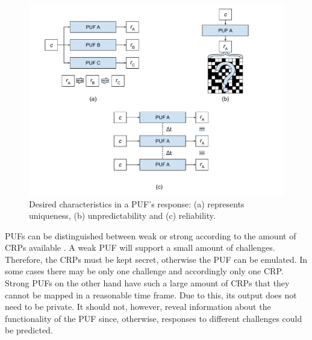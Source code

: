 \begin{figure}[H]
    \centering
    \includegraphics[width=15cm]{images/PUF requirements.pdf}
    \caption{Desired characteristics in a PUF's response: (a) represents uniqueness, (b) unpredictability and (c) reliability. }
    \label{fig:req}
\end{figure}

PUFs can be distinguished between weak or strong according to the amount of CRPs available \cite{Herder2014}. A weak PUF will support a small amount of challenges. Therefore, the CRPs must be kept secret, otherwise the PUF can be emulated. In some cases there may be only one challenge and accordingly only one CRP. Strong PUFs on the other hand have such a large amount of CRPs that they cannot be mapped in a reasonable time frame. Due to this, its output does not need to be private. It should not, however, reveal information about the functionality of the PUF since, otherwise, responses to different challenges could be predicted. 





